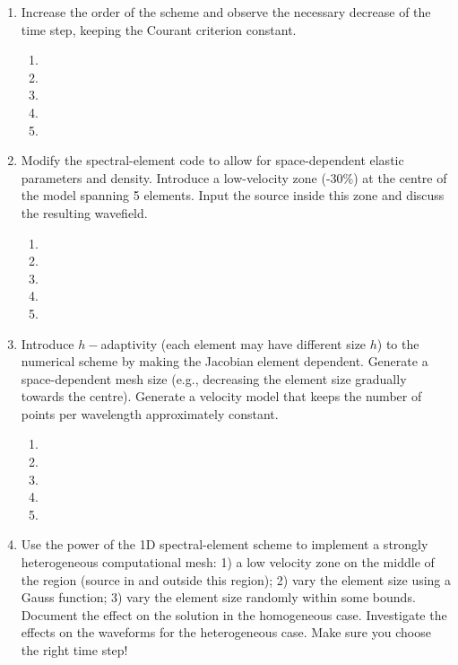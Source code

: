 \begin{enumerate}
\begin{enumerate}
\item[]
\item[]
\item[] 
\item[]
\item[] 
\end{enumerate}
\item
Increase the order of the scheme and observe the necessary decrease of the time step, keeping the Courant criterion constant.
\begin{enumerate}
\item[]
\item[]
\item[] 
\item[]
\item[] 
\end{enumerate}
\item
Modify the spectral-element code to allow for space-dependent elastic parameters and density. Introduce a low-velocity zone (-30\%) at the centre of the model spanning 5 elements. Input the source inside this zone and discuss the resulting wavefield. 
\begin{enumerate}
\item[]
\item[]
\item[] 
\item[]
\item[] 
\end{enumerate}
\item
Introduce $h-$adaptivity  (each element may have different size $h$) to the numerical scheme by making the Jacobian element dependent. Generate a space-dependent mesh size (e.g., decreasing the element size gradually towards the centre). Generate a velocity model that keeps the number of points per wavelength approximately constant.  
\begin{enumerate}
\item[]
\item[]
\item[] 
\item[]
\item[] 
\end{enumerate}
\item
Use the power of the 1D spectral-element scheme to implement a strongly heterogeneous computational mesh: 1) a low velocity zone on the middle of the region (source in and outside this region); 2) vary the element size using a Gauss function; 3) vary the element size randomly within some bounds. Document the effect on the solution in the homogeneous case. Investigate the effects on the waveforms for the heterogeneous case. Make sure you choose the right time step!

\end{enumerate}
